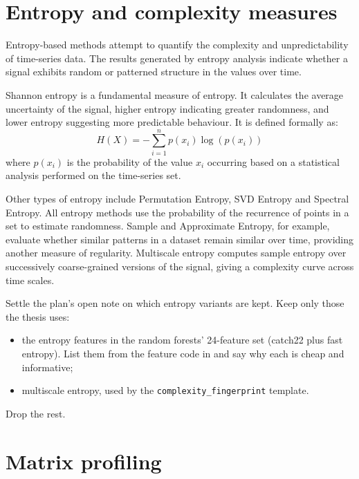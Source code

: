 \section{Entropy and complexity measures}
\label{sec:entropy}

Entropy-based methods attempt to quantify the complexity and unpredictability of time-series data. The results generated by entropy analysis indicate whether a signal exhibits random or patterned structure in the values over time.

Shannon entropy is a fundamental measure of entropy. It calculates the average uncertainty of the signal, higher entropy indicating greater randomness, and lower entropy suggesting more predictable behaviour. It is defined formally as:
\begin{equation}
H(X) = -\sum_{i=1}^{n} p(x_i) \log\left(p(x_i)\right)
\end{equation}
where $p(x_i)$ is the probability of the value $x_i$ occurring based on a statistical analysis performed on the time-series set.

Other types of entropy include Permutation Entropy, SVD Entropy and Spectral Entropy. All entropy methods use the probability of the recurrence of points in a set to estimate randomness. Sample and Approximate Entropy, for example, evaluate whether similar patterns in a dataset remain similar over time, providing another measure of regularity. Multiscale entropy \cite{costa2002mse} computes sample entropy over successively coarse-grained versions of the signal, giving a complexity curve across time scales.

\begin{instructions}
Settle the plan's open note on which entropy variants are kept. Keep only those the thesis uses:
\begin{itemize}
  \item the entropy features in the random forests' 24-feature set (catch22 plus fast entropy). List them from the
        feature code in  and say why each is cheap and informative;
  \item multiscale entropy, used by the \texttt{complexity\_fingerprint} template.
\end{itemize}
Drop the rest.
\end{instructions}

\section{Matrix profiling}
\label{sec:mp}

